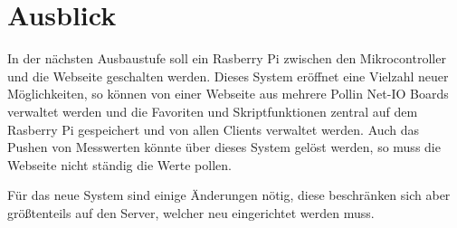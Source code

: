 \chapter{Ausblick}
\label{ausblick}
In der nächsten Ausbaustufe soll ein Rasberry Pi zwischen den Mikrocontroller
und die Webseite geschalten werden. Dieses System eröffnet eine Vielzahl
neuer Möglichkeiten, so können von einer Webseite aus mehrere Pollin Net-IO
Boards verwaltet werden und die Favoriten und Skriptfunktionen zentral auf dem
Rasberry Pi gespeichert und von allen Clients verwaltet werden. Auch das Pushen von
Messwerten könnte über dieses System gelöst werden, so muss die Webseite nicht
ständig die Werte pollen.

Für das neue System sind einige Änderungen nötig, diese beschränken sich aber
größtenteils auf den Server, welcher neu eingerichtet werden muss.
